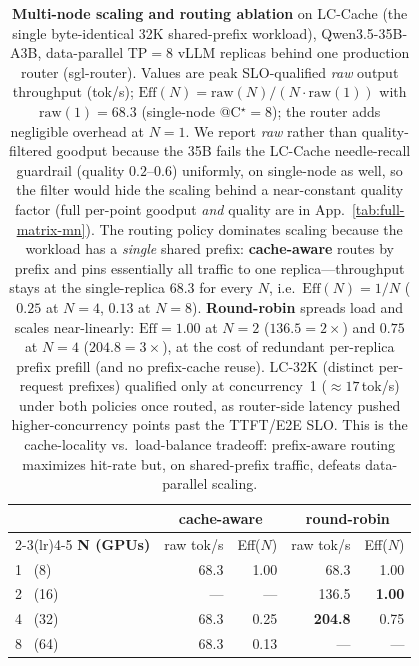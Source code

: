 
\begin{table}[t]
  \centering
  \small
  \begin{tabular}{@{}l r r r r@{}}
    \toprule
    & \multicolumn{2}{c}{\textbf{cache-aware}} & \multicolumn{2}{c}{\textbf{round-robin}} \\
    \cmidrule(lr){2-3}\cmidrule(lr){4-5}
    \textbf{N (GPUs)} & raw tok/s & Eff($N$) & raw tok/s & Eff($N$) \\
    \midrule
    1 \ (8)   & 68.3 & 1.00 & 68.3 & 1.00 \\
    2 \ (16)  & ---  & ---  & 136.5 & \textbf{1.00} \\
    4 \ (32)  & 68.3 & 0.25 & \textbf{204.8} & 0.75 \\
    8 \ (64)  & 68.3 & 0.13 & ---  & ---  \\
    \bottomrule
  \end{tabular}
  \caption{\textbf{Multi-node scaling and routing ablation} on LC-Cache (the
  single byte-identical 32K shared-prefix workload), Qwen3.5-35B-A3B,
  data-parallel TP$=$8 vLLM replicas behind one production router (sgl-router).
  Values are peak SLO-qualified \emph{raw} output throughput (tok/s);
  $\text{Eff}(N)=\text{raw}(N)/(N\cdot\text{raw}(1))$ with $\text{raw}(1){=}68.3$
  (single-node @C$^\star{=}8$); the router adds negligible overhead at $N{=}1$.
  We report \emph{raw} rather than quality-filtered goodput because the 35B fails
  the LC-Cache needle-recall guardrail (quality $0.2$--$0.6$) uniformly, on
  single-node as well, so the filter would hide the scaling behind a
  near-constant quality factor (full per-point goodput \emph{and} quality are in
  App.~\ref{tab:full-matrix-mn}). The routing policy dominates scaling because the
  workload has a \emph{single} shared prefix: \textbf{cache-aware} routes by prefix
  and pins essentially all traffic to one replica---throughput stays at the
  single-replica $68.3$ for every $N$, i.e.\ $\text{Eff}(N)\!=\!1/N$ ($0.25$ at
  $N{=}4$, $0.13$ at $N{=}8$). \textbf{Round-robin} spreads load and scales
  near-linearly: $\text{Eff}{=}1.00$ at $N{=}2$ ($136.5{=}2\times$) and $0.75$ at
  $N{=}4$ ($204.8{=}3\times$), at the cost of redundant per-replica prefix prefill
  (and no prefix-cache reuse). LC-32K (distinct per-request prefixes) qualified
  only at concurrency~1 ($\approx17$\,tok/s) under both policies once routed, as
  router-side latency pushed higher-concurrency points past the TTFT/E2E SLO.
  This is the cache-locality vs.\ load-balance tradeoff: prefix-aware routing
  maximizes hit-rate but, on shared-prefix traffic, defeats data-parallel scaling.}
  \label{tab:scaling}
\end{table}
